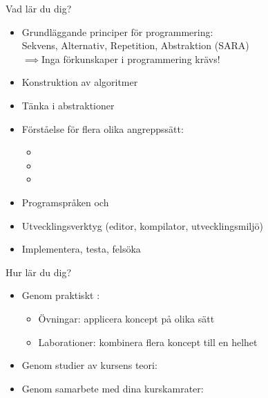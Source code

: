 \begin{Slide}{Vad lär du dig?}
\begin{itemize}
\item Grundläggande principer för programmering:\\ Sekvens, Alternativ, Repetition, Abstraktion (SARA)\\$\implies$Inga förkunskaper i programmering krävs!
\item Konstruktion av algoritmer
\item Tänka i abstraktioner
\item Förståelse för flera olika angreppssätt: 
\begin{itemize}
\item {}%
\item {}%
\item {}%
\end{itemize}
\item Programspråken  och 
\item Utvecklingsverktyg (editor, kompilator, utvecklingsmiljö)
\item Implementera, testa, felsöka
\end{itemize}
\end{Slide}

\begin{Slide}{Hur lär du dig?}
\begin{itemize}
\item Genom praktiskt : 
\begin{itemize}
\item Övningar: applicera koncept på olika sätt
\item Laborationer: kombinera flera koncept till en helhet
\end{itemize}
\item Genom studier av kursens teori: 
\item Genom samarbete med dina kurskamrater: 
\end{itemize}
\end{Slide}


